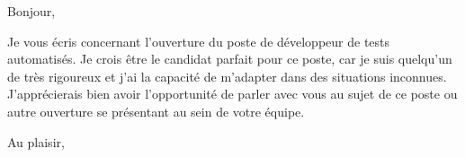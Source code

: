 \documentclass[12pt,french]{letter}
\begin{document}

\begin{letter}{}
\address{Montréal, Canada}

\opening{Bonjour,}


Je vous écris concernant l'ouverture du poste de développeur de tests automatisés.
Je crois être le candidat parfait pour ce poste, car je suis quelqu'un de très rigoureux et j'ai la capacité de m'adapter dans des situations inconnues.\\
J'apprécierais bien avoir l'opportunité de parler avec vous au sujet de ce poste ou autre ouverture se présentant au sein de votre équipe.
\signature{Maxime}

\closing{Au plaisir,}


\end{letter}
\end{document}
